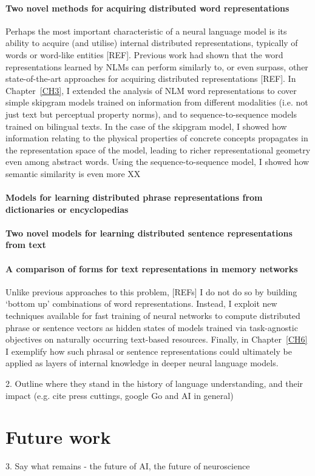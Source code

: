 \paragraph{Two novel methods for acquiring distributed word representations} Perhaps the most important characteristic of a neural language model is its ability to acquire (and utilise) internal distributed representations, typically of words or word-like entities [REF]. Previous work had shown that the word representations learned by NLMs can perform similarly to, or even surpass, other state-of-the-art approaches for acquiring distributed representations [REF]. In Chapter~\ref{CH3}, I extended the analysis of NLM word representations to cover simple skipgram models trained on information from different modalities (i.e. not just text but perceptual property norms), and to sequence-to-sequence models trained on bilingual texts. In the case of the skipgram model, I showed how information relating to the physical properties of concrete concepts propagates in the representation space of the model, leading to richer representational geometry even among abstract words. Using the sequence-to-sequence model, I showed how semantic similarity is even more XX

\paragraph{Models for learning distributed phrase representations from dictionaries or encyclopedias}

\paragraph{Two novel models for learning distributed sentence representations from text}

\paragraph{A comparison of forms for text representations in memory networks}

Unlike previous approaches to this problem, [REFs] I do not do so by building `bottom up' combinations of word representations. Instead, I exploit new techniques available for fast training of neural networks to compute distributed phrase or sentence vectors as hidden states of models trained via task-agnostic objectives on naturally occurring text-based resources. Finally, in Chapter~\ref{CH6} I exemplify how such phrasal or sentence representations could ultimately be applied as layers of internal knowledge in deeper neural language models.   



2. Outline where they stand in the history of language understanding, and their impact (e.g. cite press cuttings, google Go and AI in general)

\section{Future work}
3. Say what remains - the future of AI, the future of neuroscience